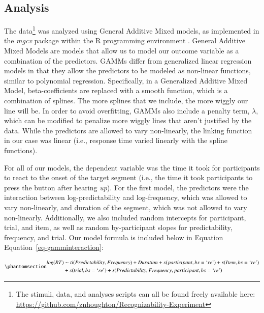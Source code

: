 \documentclass[
  authoryear,
  preprint,
  1p,
  onecolumn]{elsarticle}
\begin{document}
\subsection{Analysis}\label{analysis}

The data\footnote{The stimuli, data, and analyses scripts can all be
  found freely available here:
  \url{https://github.com/znhoughton/Recognizability-Experiment}} was
analyzed using General Additive Mixed models, as implemented in the
\emph{mgcv} package \citep{mgcv} within the R programming environment
\citep{Rpackage}. General Additive Mixed Models are models that allow us
to model our outcome variable as a combination of the predictors. GAMMs
differ from generalized linear regression models in that they allow the
predictors to be modeled as non-linear functions, similar to polynomial
regression. Specifically, in a Generalized Additive Mixed Model,
beta-coefficients are replaced with a smooth function, which is a
combination of splines. The more splines that we include, the more
wiggly our line will be. In order to avoid overfitting, GAMMs also
include a penalty term, \(\lambda\), which can be modified to penalize
more wiggly lines that aren't justified by the data. While the
predictors are allowed to vary non-linearly, the linking function in our
case was linear (i.e., response time varied linearly with the spline
functions).

For all of our models, the dependent variable was the time it took for
participants to react to the onset of the target segment (i.e., the time
it took participants to press the button after hearing \emph{up}). For
the first model, the predictors were the interaction between
log-predictability and log-frequency, which was allowed to vary
non-linearly, and duration of the segment, which was not allowed to vary
non-linearly. Additionally, we also included random intercepts for
participant, trial, and item, as well as random by-participant slopes
for predictability, frequency, and trial. Our model formula is included
below in Equation Equation~\ref{eq-gamminteraction}:

\begin{equation}\phantomsection\label{eq-gamminteraction}{
\begin{aligned}log(RT) & \sim ti(Predictability, Frequency) + Duration + s(participant, bs = \text{`}re\text{'}) + s(Item, bs = \text{`}re\text{'}) \\& + s(trial, bs = \text{`}re\text{'}) + s(Predictability, Frequency, participant, bs = \text{`}re\text{'}) \end{aligned}
}\end{equation}
\end{document}
